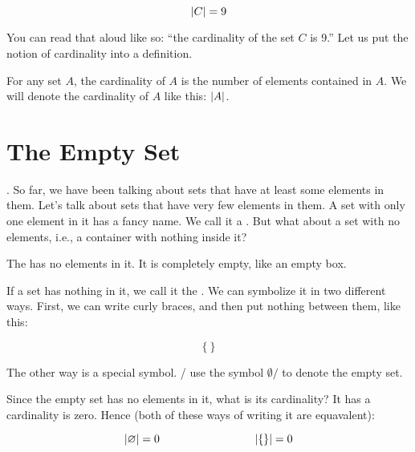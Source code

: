 \documentclass[../../../main.tex]{subfiles}
\begin{document}
\begin{equation*}
  |C| = 9
\end{equation*}

You can read that aloud like so: ``the cardinality of the set $C$ is 9.'' Let us put the notion of cardinality into a definition.

\begin{fdefinition}[Cardinality]
  \label{def:set-cardinality}
  For any set $A$, the cardinality of $A$ is the number of elements contained in $A$. We will denote the cardinality of $A$ like this: $|A|$.
\end{fdefinition}


\section{The Empty Set}

. So far, we have been talking about sets that have at least some elements in them. Let's talk about sets that have very few elements in them. A set with only one element in it has a fancy name. We call it a . But what about a set with no elements, i.e., a container with nothing inside it?

\begin{terminology}
  The  has no elements in it. It is completely empty, like an empty box.
\end{terminology}

If a set has nothing in it, we call it the . We can symbolize it in two different ways. First, we can write curly braces, and then put nothing between them, like this:

\begin{equation*}
  \{ ~ \}
\end{equation*}

The other way is a special symbol. \Mathers/ use the symbol $\emptyset/$ to denote the empty set.

Since the empty set has no elements in it, what is its cardinality? It has a cardinality is zero. Hence (both of these ways of writing it are equavalent): 

\begin{equation*}
  \cardinality{\emptyset/} = 0 \hskip 3cm \cardinality{\{ \}} = 0
\end{equation*}
\end{document}
